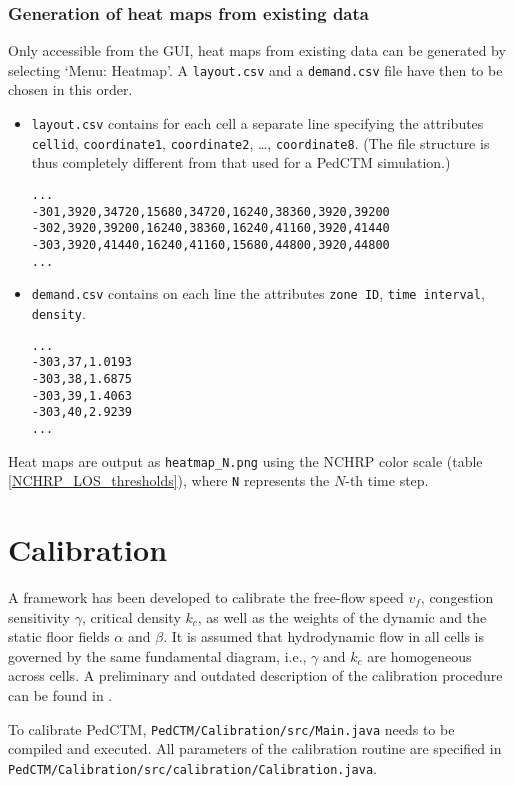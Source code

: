 \documentclass[a4paper,12pt]{article}
\begin{document}
\subsubsection{Generation of heat maps from existing data}
Only accessible from the GUI, heat maps from existing data can be generated by selecting `Menu: Heatmap'. A \verb+layout.csv+ and a \verb+demand.csv+ file have then to be chosen in this order.

\begin{itemize}
\item \verb+layout.csv+ contains for each cell a separate line specifying the attributes \verb+cellid+, \verb+coordinate1+, \verb+coordinate2+, \dots, \verb+coordinate8+. (The file structure is thus completely different from that used for a PedCTM simulation.)
\begin{Verbatim}
...
-301,3920,34720,15680,34720,16240,38360,3920,39200
-302,3920,39200,16240,38360,16240,41160,3920,41440
-303,3920,41440,16240,41160,15680,44800,3920,44800
...
\end{Verbatim}

\item \verb+demand.csv+ contains on each line the attributes \verb+zone ID+, \verb+time interval+, \verb+density+. 
\begin{Verbatim}
...
-303,37,1.0193
-303,38,1.6875
-303,39,1.4063
-303,40,2.9239
...
\end{Verbatim}
\end{itemize}

Heat maps are output as \verb+heatmap_N.png+ using the NCHRP color scale (table \ref{NCHRP_LOS_thresholds}), where \verb+N+ represents the $N$-th time step.

\section{Calibration}
A framework has been developed to calibrate the free-flow speed $v_f$, congestion sensitivity $\gamma$, critical density $k_c$, as well as the weights of the dynamic and the static floor fields $\alpha$ and $\beta$. It is assumed that hydrodynamic flow in all cells is governed by the same fundamental diagram, i.e., $\gamma$ and $k_c$ are homogeneous across cells. A preliminary and outdated description of the calibration procedure can be found in \cite{CalibPedCTM}.

To calibrate PedCTM, \verb+PedCTM/Calibration/src/Main.java+ needs to be compiled and executed. All parameters of the calibration routine are specified in \verb+PedCTM/Calibration/src/calibration/Calibration.java+.
\end{document}
